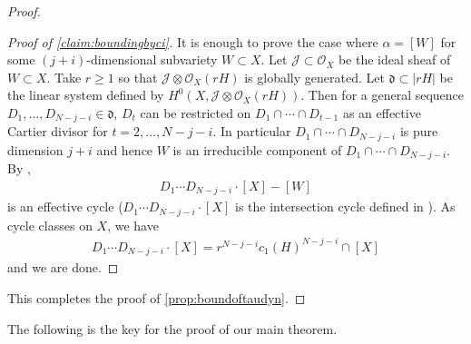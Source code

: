 \documentclass[12pt]{amsart}
\theoremstyle{plain}
\theoremstyle{definition}
\numberwithin{equation}{section}
\def\dd{{ \mathfrak{d}}}
\def\O{{ \mathcal{O}}}
\def\a{{ \mathfrak{a}}}
\def\J{{ \mathcal{J}}}
\renewcommand{\a}{\alpha}
\begin{document}
\begin{proof}
\begin{proof}[Proof of \cref{claim:boundingbyci}]
It is enough to prove the case where $\a = [W]$ for some $(j+i)$-dimensional subvariety $W \subset X$.
Let $\J \subset \O_{X}$ be the ideal sheaf of $W \subset X$.
Take $r \geq 1$ so that $\J \otimes \O_{X}(rH)$ is globally generated.
Let $\dd \subset |rH|$ be the linear system defined by $H^{0}(X, \J \otimes \O_{X}(rH))$.
Then for a general sequence $D_{1} ,\dots, D_{N-j-i} \in \dd$, 
$D_{t}$ can be restricted on $D_{1} \cap \cdots \cap D_{t-1}$
as an effective Cartier divisor for $t = 2, \dots, N-j-i$.
In particular 
$D_{1} \cap \cdots \cap D_{N-j-i}$
is pure dimension $j+i$ and hence $W$ is an irreducible component of $D_{1} \cap \cdots \cap D_{N-j-i}$.
By \cite[Lemma 1.7.2]{fulintersec},
\begin{align}
D_{1} \cdots  D_{N-j-i} \cdot [X] - [W]
\end{align}
is an effective cycle 
($D_{1} \cdots  D_{N-j-i} \cdot [X]$ is the intersection cycle defined in 
\cite[Chapter 2, 2.3]{fulintersec}).
As cycle classes on $X$, we have
\begin{align}
D_{1} \cdots  D_{N-j-i} \cdot [X] = r^{N-j-i} c_{1}(H)^{N-j-i} \cap [X]
\end{align}
and we are done.
\end{proof}
This completes the proof of \cref{prop:boundoftaudyn}.
\end{proof}

\fi


The following is the key for the proof of our main theorem.
\end{document}
